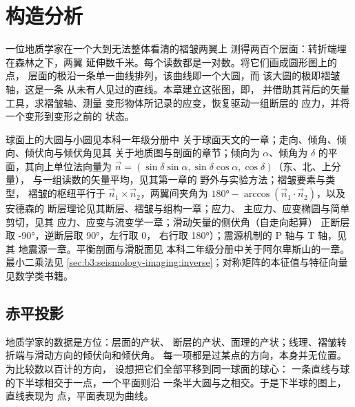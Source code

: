 \chapter{构造分析}\label{ch:b3:structural-analysis}

一位地质学家在一个大到无法整体看清的褶皱两翼上
测得两百个层面：转折端埋在森林之下，两翼
延伸数千米。每个读数都是一对数。将它们画成圆形图上的点，
层面的极沿一条单一曲线排列，该曲线即一个大圆，而
该大圆的极即褶皱轴，这是一条
从未有人见过的直线。本章建立这张图，即，
并借助其背后的矢量工具，求褶皱轴、测量
变形物体所记录的应变，恢复驱动一组断层的
应力，并将一个变形到变形之前的
状态。

\begin{recall}
球面上的大圆与小圆见本科一年级分册中
关于球面天文的一章；走向、倾角、倾向、倾伏向与倾伏角见其
关于地质图与剖面的章节；倾向为
$\alpha$、倾角为 $\delta$ 的平面，其向上单位法向量为 $\vec n = (\sin\delta
\sin\alpha, \sin\delta\cos\alpha, \cos\delta)$（东、北、上分量），
与一组读数的矢量平均，见其第一章的
野外与实验方法；褶皱要素与类型，
褶皱的枢纽平行于 $\vec n_1\times\vec n_2$，两翼间夹角为
$\ang{180} - \arccos(\vec n_1\cdot\vec n_2)$，以及安德森的
断层理论见其断层、褶皱与组构一章；应力、
主应力、应变椭圆与简单剪切，见其
应力、应变与流变学一章；滑动矢量的侧伏角（自走向起算）
正断层取 \ang{-90}，逆断层取 \ang{90}，左行取 0，
右行取 \ang{180}）；震源机制的 P 轴与 T 轴，见其
地震源一章。平衡剖面与滑脱面见
本科二年级分册中关于阿尔卑斯山的一章。最小二乘法见
\cref{sec:b3:seismology-imaging:inverse}；对称矩阵的本征值与特征向量
见数学类书籍。
\end{recall}

\section{赤平投影}\label{sec:b3:structural-analysis:stereo}

地质学家的数据是方位：层面的产状、
断层的产状、面理的产状；线理、褶皱转折端与滑动方向的倾伏向和倾伏角。
每一项都是过某点的方向，本身并无位置。为比较数以百计的方向，
设想把它们全部平移到同一球面的球心：
一条直线与球的下半球相交于一点，一个平面则沿
一条半大圆与之相交。于是下半球的图上，直线表现为
点，平面表现为曲线。

